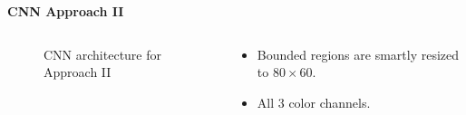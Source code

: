 \begin{frame}{\textbf{CNN Approach II}}
\begin{columns}
	\begin{column}{0.6\textwidth}
	\begin{figure}
		\centering
		\caption{CNN architecture for Approach II}
	\end{figure}
	\end{column}
	\begin{column}{0.4\textwidth}
	\begin{varblock}[0.85\textwidth]{}
		\begin{itemize}
			\item Bounded regions are smartly resized to $80 \times 60$.
			\item All 3 color channels.
		\end{itemize}
	\end{varblock}
	\end{column}
\end{columns}
\end{frame}

